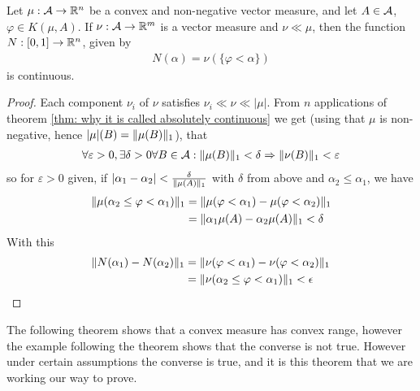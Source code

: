 \begin{lemma}\label{lem: continuous map from measure}
Let $\mu : \m{A} \to \R^{n}$ be a convex and non-negative vector measure, and let $A \in \m{A}$, $\varphi \in K(\mu, A)$. If $\nu: \m{A} \to \R^{m}$ is a vector measure and $\nu \ll \mu$, then the function $N:[0,1] \to \R^{n}$, given by
\begin{align*}
	N(\alpha) = \nu(\{\varphi < \alpha\})
\end{align*}
is continuous.
\end{lemma}
\begin{proof}
Each component $\nu_{i}$ of $\nu$ satisfies $\nu_{i}\ll \nu \ll |\mu|$. From $n$ applications of theorem \cref{thm: why it is called absolutely continuous} we get (using that $\mu$ is non-negative, hence $|\mu|(B)=\norm[1]{\mu(B)}$), that
\begin{align*}
	\forall \varepsilon > 0, \exists \delta > 0 \forall B\in \m{A}: \norm[1]{\mu(B)} < \delta \Rightarrow \norm[1]{\nu(B)} < \varepsilon
\end{align*}
so for $\varepsilon > 0$ given, if $|\alpha_{1}-\alpha_{2}| < \frac{\delta}{\norm[1]{\mu(A)}}$ with $\delta$ from above and $\alpha_{2}\le \alpha_{1}$, we have
\begin{align*}
	\norm[1]{\mu(\alpha_{2} \le \varphi < \alpha_{1} )} &= \norm[1]{ \mu(\varphi < \alpha_{1}) - \mu(\varphi < \alpha_{2}) } \\
	& = \norm[1]{ \alpha_{1}\mu(A) - \alpha_{2}\mu(A) } < \delta
\end{align*}
With this
\begin{align*}
	\norm[1]{N(\alpha_{1})-N(\alpha_{2})} &= \norm[1]{ \nu(\varphi < \alpha_{1}) - \nu(\varphi< \alpha_{2}) } \\
	&= \norm[1]{ \nu(\alpha_{2} \le \varphi < \alpha_{1}) } < \epsilon
\end{align*}
\end{proof}


The following theorem shows that a convex measure has convex range, however the example following the theorem shows that the converse is not true. However under certain assumptions the converse is true, and it is this theorem that we are working our way to prove.

